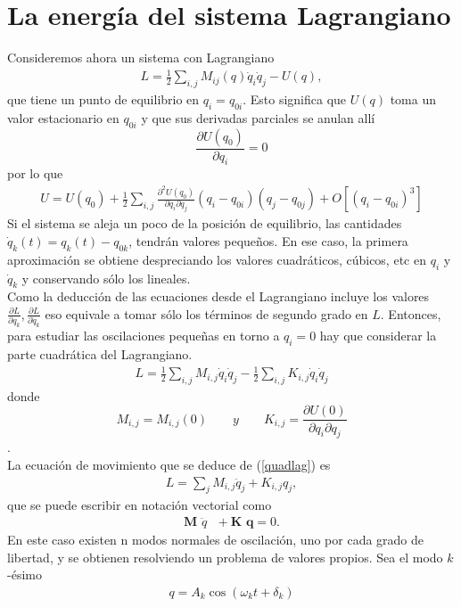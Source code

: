 \documentclass[letterpaper,12pt,oneside]{book}
\begin{document}
\section{La energ\'ia del sistema Lagrangiano}
%
Consideremos ahora un sistema con Lagrangiano
%
\begin{eqnarray}
L= \frac{1}{2}\sum_{i,j}M_{ij}(q)\dot q_i\dot q_j-U(q),
\end{eqnarray}
%
que tiene un punto de equilibrio en $q_i = q_{0i}$. Esto significa que $U(q)$ toma un valor estacionario en $q_{0i}$ y que sus derivadas parciales se anulan all\'i $$\frac{\partial U(q_0)}{\partial q_i}=0$$ por lo que
%
\begin{eqnarray}
U=U(q_0)+\frac{1}{2}\sum_{i,j}\frac{\partial^2 U(q_0)}{\partial q_i \partial q_j}(q_i - q_{0i})(q_j-q_{0j})+O[(q_i-q_{0i})^3]
\end{eqnarray}
%
Si el sistema se aleja un poco de la posici\'on de equilibrio, las cantidades $\dot q_k(t) =  q_k(t)-q_{0k}$, tendr\'an valores pequeños. En ese caso, la primera aproximaci\'on se obtiene despreciando los valores cuadr\'aticos, c\'ubicos, etc en $q_i$ y $\dot q_k$ y conservando s\'olo los lineales.\\
Como la deducci\'on de las ecuaciones desde el Lagrangiano incluye los valores $\frac{\partial L}{\partial q_k} , \frac{\partial L}{\partial \dot q_k}$ eso equivale a tomar s\'olo los t\'erminos de segundo grado en $L$. Entonces, para estudiar las oscilaciones pequeñas en torno a $q_i = 0$ hay que considerar la parte cuadr\'atica del Lagrangiano.
%
\begin{eqnarray}
L=\frac{1}{2}\sum_{i,j}M_{i,j}\dot q_i \dot q_j - \frac{1}{2}\sum_{i,j}K_{i,j}\dot q_i \dot q_j\label{quadlag}
\end{eqnarray}
%
donde $$M_{i,j}=M_{i,j}(0) \qquad y \qquad K_{i,j}= \frac{\partial U(0)}{\partial q_i \partial q_j}$$.\\
La ecuaci\'on de movimiento que se deduce de (\ref{quadlag}) es 
%
\begin{eqnarray}
L=\sum_{j}M_{i,j}\ddot q_j + K_{i,j} q_j,
\end{eqnarray}
%
que se puede escribir en notaci\'on vectorial como
%
\begin{eqnarray}
\textbf{M $\ddot q$ } + \textbf{K q} = 0.
\end{eqnarray}
%
En este caso existen n modos normales de oscilaci\'on, uno por cada grado de libertad, y se obtienen resolviendo un problema de valores propios. Sea el modo $k$-\'esimo
%
\begin{eqnarray}
q=A_k \cos (\omega_kt + \delta_k)
\end{eqnarray}
\end{document}
